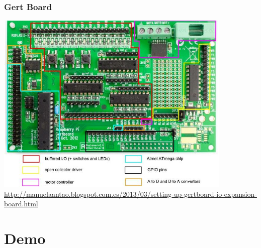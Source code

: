 \documentclass[10pt,colorlinks]{beamer}
\begin{document}
\begin{frame}[fragile]\frametitle{Gert Board}
\includegraphics[width=0.85\textwidth]{figs/gertboard2}\\

\tiny \href{http://manuelaantao.blogspot.com.es/2013/03/setting-up-gertboard-io-expansion-board.html}{http://manuelaantao.blogspot.com.es/2013/03/setting-up-gertboard-io-expansion-board.html}


\end{frame}



%

\section{Demo }
\end{document}
